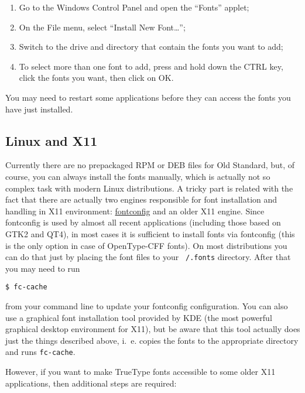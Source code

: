 \documentclass[12pt,a4paper,openany]{book}
\begin{document}
\begin{enumerate}

\item Go to the Windows Control Panel and open the “Fonts” applet;

\item On the File menu, select “Install New Font\ldots”;

\item Switch to the drive and directory that contain the fonts you want to
add;

\item To select more than one font to add, press and hold down the CTRL
key, click the fonts you want, then click on OK.

\end{enumerate}

You may need to restart some applications before they can access the fonts
you have just installed.

\subsection{Linux and X11}

Currently there are no prepackaged RPM or DEB files for Old Standard, but,
of course, you can always install the fonts manually, which is actually not
so complex task with modern Linux distributions. A tricky part is related
with the fact that there are actually two engines responsible for font
installation and handling in X11 environment:
\href{http://www.fontconfig.org}{fontconfig} and an older X11 engine. Since
fontconfig is used by almost all recent applications (including those
based on GTK2 and QT4), in most cases it is sufficient to install fonts
via fontconfig (this is the only option in case of OpenType-CFF fonts). On
most distributions you can do that just by placing the font files to your
\texttt{~/.fonts} directory. After that you may need to run

\texttt{\$ fc-cache}

\noindent from your command line to update your fontconfig configuration.
You can also use a graphical font installation tool provided by KDE (the
most powerful graphical desktop environment for X11), but be aware that
this tool actually does just the things described above, i.~e. copies the
fonts to the appropriate directory and runs \texttt{fc-cache}.

However, if you want to make TrueType fonts accessible to some older X11
applications, then additional steps are required:
\end{document}
